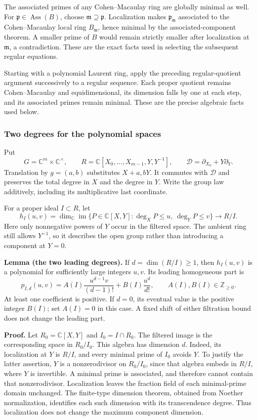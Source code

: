 \documentclass[
  11pt,
  a4paper,
]{article}
\begin{document}
The associated primes of any Cohen--Macaulay ring are globally minimal
as well. For \(\mathfrak p\in\operatorname{Ass}(B)\), choose
\(\mathfrak m\supseteq\mathfrak p\). Localization makes
\(\mathfrak p_{\mathfrak m}\) associated to the Cohen--Macaulay local
ring \(B_{\mathfrak m}\), hence minimal by the associated-component
theorem. A smaller prime of \(B\) would remain strictly smaller after
localization at \(\mathfrak m\), a contradiction. These are the exact
facts used in selecting the subsequent regular equations.

Starting with a polynomial Laurent ring, apply the preceding
regular-quotient argument successively to a regular sequence. Each
proper quotient remains Cohen--Macaulay and equidimensional, its
dimension falls by one at each step, and its associated primes remain
minimal. These are the precise algebraic facts used below.

\subsubsection{Two degrees for the polynomial
spaces}\label{two-degrees-for-the-polynomial-spaces}

Put \[
G=\mathbb C^m\times\mathbb C^\times,\qquad
R=\mathbb C[X_0,\ldots,X_{m-1},Y,Y^{-1}],\qquad
\mathcal D=\partial_{X_0}+Y\partial_Y.
\] Translation by \(g=(a,b)\) substitutes \(X+a,bY\). It commutes with
\(\mathcal D\) and preserves the total degree in \(X\) and the degree in
\(Y\). Write the group law additively, including its multiplicative last
coordinate.

For a proper ideal \(I\subset R\), let \[
h_I(u,v)=\dim_{\mathbb C}\operatorname{im}
\{P\in\mathbb C[X,Y]:\deg_X P\le u,\ \deg_Y P\le v\}
\longrightarrow R/I.
\] Here only nonnegative powers of \(Y\) occur in the filtered space.
The ambient ring still allows \(Y^{-1}\), so it describes the open group
rather than introducing a component at \(Y=0\).

\textbf{Lemma (the two leading degrees).} If \(d=\dim(R/I)\ge1\), then
\(h_I(u,v)\) is a polynomial for sufficiently large integers \(u,v\).
Its leading homogeneous part is \[
p_{I,d}(u,v)=A(I)\frac{u^{d-1}v}{(d-1)!}
             +B(I)\frac{u^d}{d!},\qquad A(I),B(I)\in\mathbb Z_{\ge0}.
\tag{7.49}
\] At least one coefficient is positive. If \(d=0\), its eventual value
is the positive integer \(B(I)\); set \(A(I)=0\) in this case. A fixed
shift of either filtration bound does not change the leading part.

\textbf{Proof.} Let \(R_0=\mathbb C[X,Y]\) and \(I_0=I\cap R_0\). The
filtered image is the corresponding space in \(R_0/I_0\). This algebra
has dimension \(d\). Indeed, its localization at \(Y\) is \(R/I\), and
every minimal prime of \(I_0\) avoids \(Y\). To justify the latter
assertion, \(Y\) is a nonzerodivisor on \(R_0/I_0\), since that algebra
embeds in \(R/I\), where \(Y\) is invertible. A minimal prime is
associated, and therefore cannot contain that nonzerodivisor.
Localization leaves the fraction field of each minimal-prime domain
unchanged. The finite-type dimension theorem, obtained from Noether
normalization, identifies each such dimension with its transcendence
degree. Thus localization does not change the maximum component
dimension.
\end{document}
